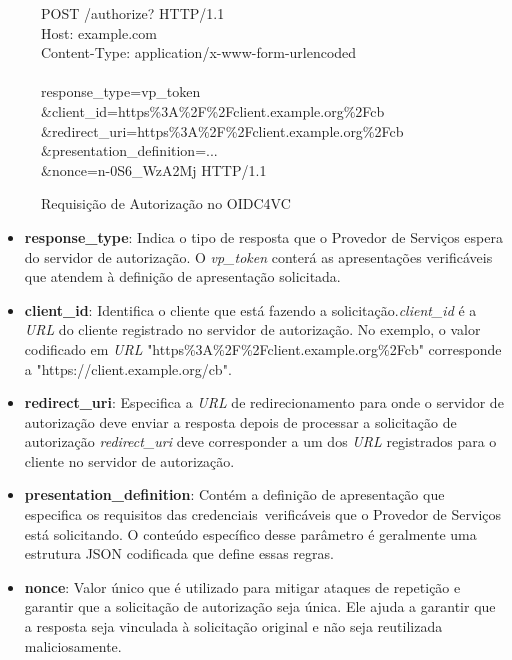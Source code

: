 \begin{figure}[h]

    {\couriernew
    POST /authorize? HTTP/1.1\\
    Host: example.com \\
    Content-Type: application/x-www-form-urlencoded\\\\
    response\_type=vp\_token\\
    \&client\_id=https\%3A\%2F\%2Fclient.example.org\%2Fcb \\
    \&redirect\_uri=https\%3A\%2F\%2Fclient.example.org\%2Fcb \\
    \&presentation\_definition=... \\
    \&nonce=n-0S6\_WzA2Mj HTTP/1.1 \\
    }
    
  \caption{Requisição de Autorização no OIDC4VC}
  \label{fig:auth-req-oidc4vc}
\end{figure}


\begin{itemize}

    \item \textbf{response\_type}: Indica o tipo de resposta que o Provedor de Serviços espera do servidor de autorização. O \textit{vp\_token} conterá as apresentações verificáveis que atendem à definição de apresentação solicitada.

    \item \textbf{client\_id}: Identifica o cliente que está fazendo a solicitação.\textit{client\_id} é a \textit{URL} do cliente registrado no servidor de autorização. No exemplo, o valor codificado em \textit{URL} "https\%3A\%2F\%2Fclient.example.org\%2Fcb" corresponde a "https://client.example.org/cb".

    \item \textbf{redirect\_uri}: Especifica a \textit{URL} de redirecionamento para onde o servidor de autorização deve enviar a resposta depois de processar a solicitação de autorização \textit{redirect\_uri} deve corresponder a um dos \textit{URL} registrados para o cliente no servidor de autorização. 
    
    \item \textbf{presentation\_definition}: Contém a definição de apresentação que especifica os requisitos das credenciais\ verificáveis que o Provedor de Serviços está solicitando. O conteúdo específico desse parâmetro é geralmente uma estrutura JSON codificada que define essas regras.

    \item \textbf{nonce}: Valor único que é utilizado para mitigar ataques de repetição e garantir que a solicitação de autorização seja única. Ele ajuda a garantir que a resposta seja vinculada à solicitação original e não seja reutilizada maliciosamente.

\end{itemize}